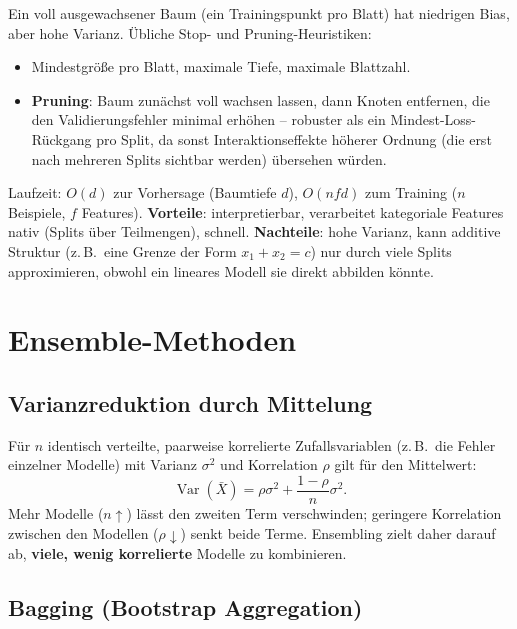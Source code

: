 \documentclass[11pt]{article}
\theoremstyle{csthm}
\theoremstyle{csdef}
\begin{document}
Ein voll ausgewachsener Baum (ein Trainingspunkt pro Blatt) hat niedrigen
Bias, aber hohe Varianz. Übliche Stop- und Pruning-Heuristiken:
\begin{itemize}
  \item Mindestgröße pro Blatt, maximale Tiefe, maximale Blattzahl.
  \item \textbf{Pruning}: Baum zunächst voll wachsen lassen, dann Knoten
        entfernen, die den Validierungsfehler minimal erhöhen -- robuster
        als ein Mindest-Loss-Rückgang pro Split, da sonst Interaktionseffekte
        höherer Ordnung (die erst nach mehreren Splits sichtbar werden)
        übersehen würden.
\end{itemize}
Laufzeit: $O(d)$ zur Vorhersage (Baumtiefe $d$), $O(nfd)$ zum Training
($n$ Beispiele, $f$ Features). \textbf{Vorteile}: interpretierbar,
verarbeitet kategoriale Features nativ (Splits über Teilmengen), schnell.
\textbf{Nachteile}: hohe Varianz, kann additive Struktur (z.\,B.\ eine
Grenze der Form $x_1+x_2=c$) nur durch viele Splits approximieren, obwohl
ein lineares Modell sie direkt abbilden könnte.

\section{Ensemble-Methoden}

\subsection{Varianzreduktion durch Mittelung}

Für $n$ identisch verteilte, paarweise korrelierte Zufallsvariablen (z.\,B.\
die Fehler einzelner Modelle) mit Varianz $\sigma^2$ und Korrelation $\rho$
gilt für den Mittelwert:
\begin{equation}
  \operatorname{Var}(\bar X) = \rho\sigma^2 + \frac{1-\rho}{n}\sigma^2.
\end{equation}
Mehr Modelle ($n\uparrow$) lässt den zweiten Term verschwinden; geringere
Korrelation zwischen den Modellen ($\rho\downarrow$) senkt beide Terme.
Ensembling zielt daher darauf ab, \textbf{viele, wenig korrelierte} Modelle
zu kombinieren.

\subsection{Bagging (Bootstrap Aggregation)}
\end{document}
